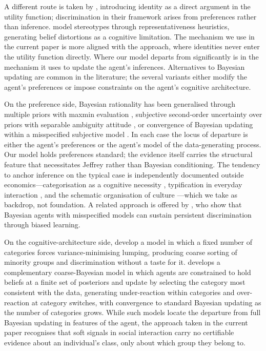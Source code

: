 \documentclass[pdflatex,sn-basic]{sn-jnl}
\theoremstyle{thmstyleone}
\numberwithin{proposition}{subsection}
\begin{document}
A different route is taken by \citet{AkerlofKranton2000}, introducing
identity as a direct argument in the utility function; discrimination
in their framework arises from preferences rather than inference.
\citet{BordaloEtal2016} model stereotypes through representativeness
heuristics, generating belief distortions as a cognitive limitation.
The mechanism we use in the current paper is more aligned with the
\citet{ColeMailathPostlewaite1992} approach, where identities never
enter the utility function directly. Where our model departs from \citet{ColeMailathPostlewaite1992}
significantly is in the mechanism it uses to update the agent's
inferences. Alternatives to Bayesian updating are common in the
literature; the several variants either modify the agent's preferences
or impose constraints on the agent's cognitive architecture.

On the preference side, Bayesian rationality has been generalised
through multiple priors with maxmin evaluation
\citep{GilboaSchmeidler1989}, subjective second-order uncertainty
over priors with separable ambiguity attitude
\citep{KlibanoffMarinacciMukerji2005}, or convergence of Bayesian
updating within a misspecified subjective model
\citep{EspondaPouzo2016}. In each case the locus of departure is
either the agent's preferences or the agent's model of the
data-generating process. Our model holds preferences standard; the
evidence itself carries the structural feature that necessitates
Jeffrey rather than Bayesian conditioning. The tendency to anchor inference on the
typical case is independently documented outside
economics---categorisation as a cognitive necessity
\citep{Allport1954}, typification in everyday interaction
\citep{BergerLuckmann1966}, and the schematic organisation of
culture \citep{DiMaggio1997}---which we take as backdrop, not
foundation. A related approach is
offered by \citet{BohrenImasRosenberg2019}, who show that Bayesian
agents with misspecified models can sustain persistent discrimination
through biased learning.

On the cognitive-architecture side, \citet{FryerJackson2008} develop a
model in which a fixed number of categories forces
variance-minimising lumping, producing coarse sorting of minority
groups and discrimination without a taste for it.
\citet{Mullainathan2002} develops a complementary coarse-Bayesian
model in which agents are constrained to hold beliefs at a finite set
of posteriors and update by selecting the category most consistent
with the data, generating under-reaction within categories and
over-reaction at category switches, with convergence to standard
Bayesian updating as the number of categories grows. While such models
locate the departure from full Bayesian updating in features of the
agent, the approach taken in the current paper recognises that soft
signals in social interaction carry no certifiable evidence about an
individual's class, only about which group they belong to.
\end{document}
